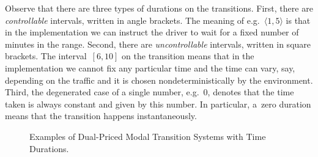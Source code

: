 Observe that there are three types of durations on the transitions. First,
there are \emph{controllable} intervals, written in angle brackets. The meaning
of e.g.~$\langle1,5\rangle$ is that in the implementation we can instruct the
driver to wait for a fixed number of minutes in the range. Second, there are
\emph{uncontrollable} intervals, written in square brackets. 
The interval~$[6,10]$ on
the \DriveBus transition means that in the implementation we cannot fix any
particular time and the time can vary, say, depending on the traffic 
and it is chosen
nondeterministically by the environment. Third, the degenerated case of a
single number, e.g.~$0$, denotes that the time taken is always constant and
given by this number. In particular, a~zero duration means that the transition
happens instantaneously.
\begin{figure}[ht]
	\centering
	\qquad
	\caption{Examples of Dual-Priced Modal Transition Systems with Time Durations.}
\end{figure}

